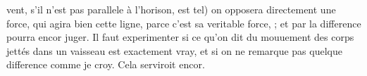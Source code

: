 vent, s'il n'est pas parallele \`{a} l'horison, est tel) on  opposera directement une force, qui agira bien  cette ligne, parce c'est sa veritable force, ; et par la difference  pourra encor juger. Il faut experimenter si ce qu'on dit du mouuement des corps jett\'{e}s dans un vaisseau\protect{} est exactement vray, et si on ne remarque pas quelque difference comme je croy. 
\pend 
\count{}
\count{}
\count{}
\pstart
Cela serviroit encor. 
\pend 
 
